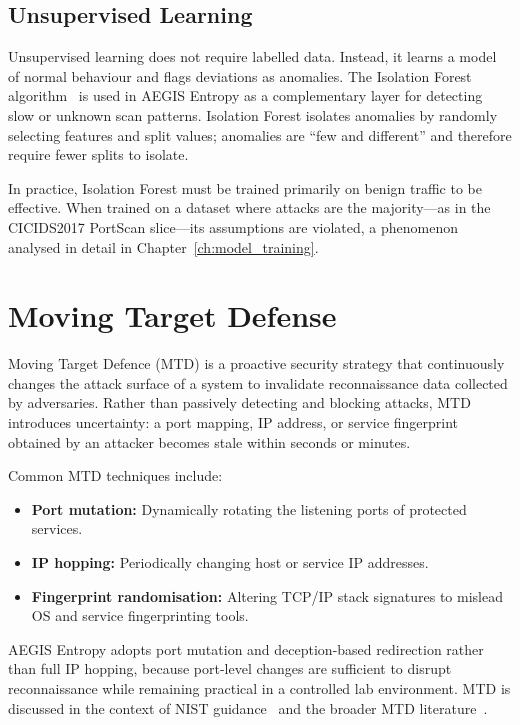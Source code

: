 \subsection{Unsupervised Learning}

Unsupervised learning does not require labelled data. Instead, it learns a model of normal behaviour and flags deviations as anomalies. The Isolation Forest algorithm~\cite{liu2008} is used in AEGIS Entropy as a complementary layer for detecting slow or unknown scan patterns. Isolation Forest isolates anomalies by randomly selecting features and split values; anomalies are ``few and different'' and therefore require fewer splits to isolate.

In practice, Isolation Forest must be trained primarily on benign traffic to be effective. When trained on a dataset where attacks are the majority---as in the CICIDS2017 PortScan slice---its assumptions are violated, a phenomenon analysed in detail in Chapter~\ref{ch:model_training}.

\section{Moving Target Defense}\label{sec:mtd}

Moving Target Defence (MTD) is a proactive security strategy that continuously changes the attack surface of a system to invalidate reconnaissance data collected by adversaries. Rather than passively detecting and blocking attacks, MTD introduces uncertainty: a port mapping, IP address, or service fingerprint obtained by an attacker becomes stale within seconds or minutes.

Common MTD techniques include:

\begin{itemize}
    \item \textbf{Port mutation:} Dynamically rotating the listening ports of protected services.
    \item \textbf{IP hopping:} Periodically changing host or service IP addresses.
    \item \textbf{Fingerprint randomisation:} Altering TCP/IP stack signatures to mislead OS and service fingerprinting tools.
\end{itemize}

AEGIS Entropy adopts port mutation and deception-based redirection rather than full IP hopping, because port-level changes are sufficient to disrupt reconnaissance while remaining practical in a controlled lab environment. MTD is discussed in the context of NIST guidance~\cite{nist2020} and the broader MTD literature~\cite{jajodia2011}.

